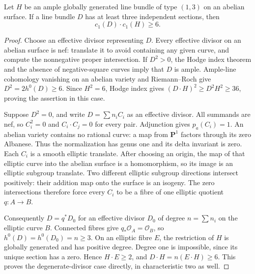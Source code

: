 \begin{lemma}
\label{lem:DE-three-section-divisor-degree}
Let \(H\) be an ample globally generated line bundle of type
\((1,3)\) on an abelian surface. If a line bundle \(D\) has
at least three independent sections, then
\[
                         c_1(D)\cdot c_1(H)\ge6.     \tag{DE-P13.4}
\]
\end{lemma}
\begin{proof}
Choose an effective divisor representing \(D\). Every effective
divisor on an abelian surface is nef: translate it to avoid
containing any given curve, and compute the nonnegative proper
intersection. If \(D^2>0\), the Hodge index theorem and the
absence of negative-square curves imply that \(D\) is ample.
Ample-line cohomology vanishing on an abelian variety and
Riemann--Roch give \(D^2=2h^0(D)\ge6\). Since \(H^2=6\),
Hodge index gives \((D\cdot H)^2\ge D^2H^2\ge36\), proving
the assertion in this case.

Suppose \(D^2=0\), and write \(D=\sum n_i C_i\) as an
effective divisor. All summands are nef, so \(C_i^2=0\) and
\(C_i\cdot C_j=0\) for every pair. Adjunction gives
\(p_a(C_i)=1\). An abelian variety contains no rational curve:
a map from \(\mathbf P^1\) factors through its zero Albanese.
Thus the normalization has genus one and its delta invariant is
zero. Each \(C_i\) is a smooth elliptic translate. After choosing
an origin, the map of that elliptic curve into the abelian surface
is a homomorphism, so its image is an elliptic subgroup translate.
Two different elliptic subgroup directions intersect positively:
their addition map onto the surface is an isogeny. The zero
intersections therefore force every \(C_i\) to be a fibre of
one elliptic quotient \(q:A\to B\).

Consequently \(D=q^*D_0\) for an effective divisor \(D_0\)
of degree \(n=\sum n_i\) on the elliptic curve \(B\).
Connected fibres give \(q_*\mathcal O_A=\mathcal O_B\), so
\(h^0(D)=h^0(D_0)=n\ge3\). On an elliptic fibre \(E\),
the restriction of \(H\) is globally generated and has positive
degree. Degree one is impossible, since its unique section has
a zero. Hence \(H\cdot E\ge2\), and
\(D\cdot H=n(E\cdot H)\ge6\).
This proves the degenerate-divisor case directly, in characteristic
two as well.
\end{proof}

